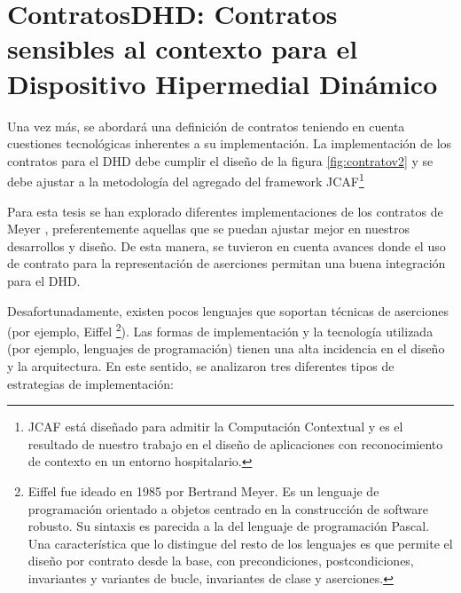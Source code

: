 \section{ContratosDHD: Contratos sensibles al contexto para el Dispositivo Hipermedial Dinámico}
\label{sec:estrategiasca}


Una vez más, se abordará una definición de contratos teniendo en cuenta cuestiones tecnológicas inherentes a su implementación. La implementación de los contratos para el DHD debe cumplir el diseño de la figura \ref{fig:contratov2} y se debe ajustar a la metodología del agregado del framework JCAF\footnote{JCAF está diseñado para admitir la Computación Contextual y es el resultado de nuestro trabajo en el diseño de aplicaciones con reconocimiento de contexto en un entorno hospitalario.} %
 

Para esta tesis se han explorado diferentes implementaciones de los contratos de Meyer \cite{Meyer}, preferentemente aquellas que se puedan ajustar mejor en nuestros desarrollos y diseño. De esta manera, se tuvieron en cuenta avances donde el uso de contrato para la representación de aserciones permitan una buena integración para el DHD. 

Desafortunadamente, existen pocos lenguajes que soportan técnicas de aserciones (por ejemplo, Eiffel \footnote{Eiffel fue ideado en 1985 por Bertrand Meyer. Es un lenguaje de programación orientado a objetos centrado en la construcción de software robusto. Su sintaxis es parecida a la del lenguaje de programación Pascal. Una característica que lo distingue del resto de los lenguajes es que permite el diseño por contrato desde la base, con precondiciones, postcondiciones, invariantes y variantes de bucle, invariantes de clase y aserciones.}). Las formas de implementación y la tecnología utilizada (por ejemplo, lenguajes de programación) tienen una alta incidencia en el diseño y la arquitectura. En este sentido, se analizaron tres diferentes tipos de estrategias de implementación:


